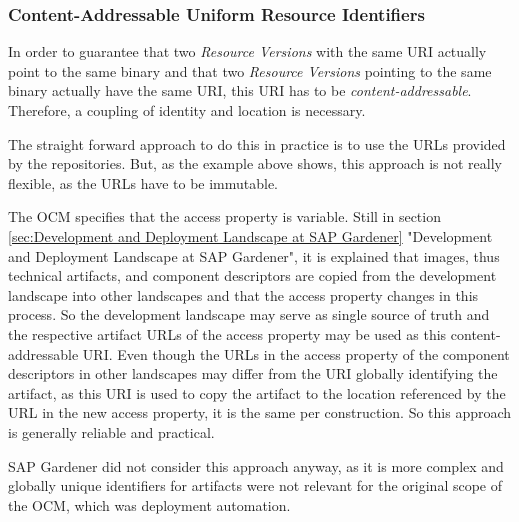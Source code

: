 \subsubsection{Content-Addressable Uniform Resource Identifiers}
In order to guarantee that two \emph{Resource Versions} with the same URI actually point to the same binary and that two \emph{Resource Versions} pointing to the same binary actually have the same URI, this URI has to be \emph{content-addressable}. Therefore, a coupling of identity and location is necessary.\par 
The straight forward approach to do this in practice is to use the URLs provided by the repositories. But, as the example above shows, this approach is not really flexible, as the URLs have to be immutable.\par 
The OCM specifies that the access property is variable. Still in section \ref{sec:Development and Deployment Landscape at SAP Gardener} "Development and Deployment Landscape at SAP Gardener", it is explained that images, thus technical artifacts, and component descriptors are copied from the development landscape into other landscapes and that the access property changes in this process. So the development landscape may serve as single source of truth and the respective artifact URLs %
of the access property may be used as this content-addressable URI. Even though the URLs in the access property of the component descriptors in other landscapes may differ from the URI globally identifying the artifact, as this URI is used to copy the artifact to the location referenced by the URL in the new access property, it is the same per construction. So this approach is generally reliable and practical.\par
SAP Gardener did not consider this approach anyway, as it is more complex and globally unique identifiers for artifacts were not relevant for the original scope of the OCM, which was deployment automation. 

